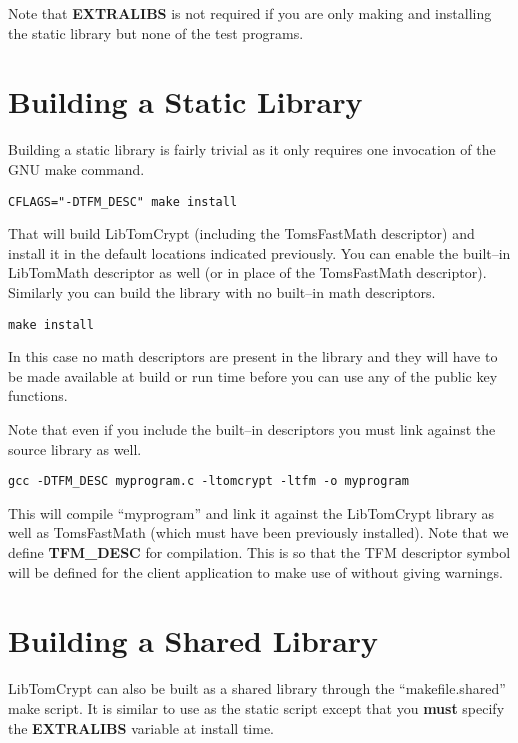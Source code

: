 \documentclass[a4paper]{book}
\begin{document}
Note that \textbf{EXTRALIBS} is not required if you are only making and installing the static library but none of the test programs.  

\section{Building a Static Library}

Building a static library is fairly trivial as it only requires one invocation of the GNU make command.  

\begin{verbatim}
CFLAGS="-DTFM_DESC" make install
\end{verbatim}

That will build LibTomCrypt (including the TomsFastMath descriptor) and install it in the default locations indicated previously.  You can enable 
the built--in LibTomMath descriptor as well (or in place of the TomsFastMath descriptor).  Similarly you can build the library with no built--in 
math descriptors.  

\begin{verbatim}
make install
\end{verbatim}

In this case no math descriptors are present in the library and they will have to be made available at build or run time before you can use any of the 
public key functions.  

Note that even if you include the built--in descriptors you must link against the source library as well.  

\begin{verbatim}
gcc -DTFM_DESC myprogram.c -ltomcrypt -ltfm -o myprogram
\end{verbatim}

This will compile ``myprogram'' and link it against the LibTomCrypt library as well as TomsFastMath (which must have been previously installed).  Note that 
we define \textbf{TFM\_DESC} for compilation.  This is so that the TFM descriptor symbol will be defined for the client application to make use of without 
giving warnings.

\section{Building a Shared Library}

LibTomCrypt can also be built as a shared library through the ``makefile.shared'' make script.  It is similar to use as the static script except
that you \textbf{must} specify the \textbf{EXTRALIBS} variable at install time.  
\end{document}

